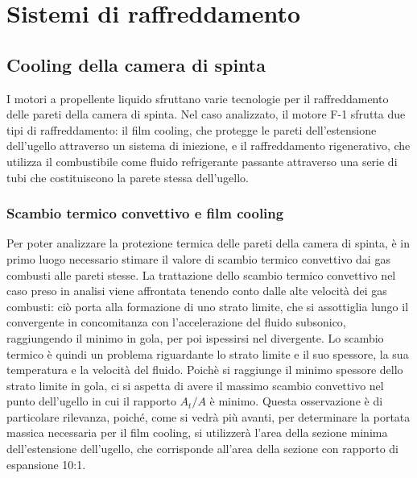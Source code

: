 \section{Sistemi di raffreddamento}
\label{sec:raffreddamento}

\subsection{Cooling della camera di spinta}
\label{subsec:cooling camera}

I motori a propellente liquido sfruttano varie tecnologie per il raffreddamento delle pareti della camera di spinta. Nel caso analizzato, il motore F-1 sfrutta due tipi di raffreddamento: il film cooling, che protegge le pareti dell'estensione dell'ugello attraverso un sistema di iniezione, e il raffreddamento rigenerativo, che utilizza il combustibile come fluido refrigerante passante attraverso una serie di tubi che costituiscono la parete stessa dell'ugello.

\subsubsection{Scambio termico convettivo e film cooling}


Per poter analizzare la protezione termica delle pareti della camera di spinta, è in primo luogo necessario stimare il valore di scambio termico convettivo dai gas combusti alle pareti stesse. La trattazione dello scambio termico convettivo nel caso preso in analisi viene affrontata tenendo conto dalle alte velocità dei gas combusti: ciò porta alla formazione di uno strato limite, che si assottiglia lungo il convergente in concomitanza con l'accelerazione del fluido subsonico, raggiungendo il minimo in gola, per poi ispessirsi nel divergente. Lo scambio termico è quindi un problema riguardante lo strato limite e il suo spessore, la sua temperatura e la velocità del fluido. Poichè si raggiunge il minimo spessore dello strato limite in gola, ci si aspetta di avere il massimo scambio convettivo nel punto dell'ugello in cui il rapporto $A_t/A$ è minimo. Questa osservazione è di particolare rilevanza, poiché, come si vedrà più avanti, per determinare la portata massica necessaria per il film cooling, si utilizzerà l'area della sezione minima dell'estensione dell'ugello, che corrisponde all'area della sezione con rapporto di espansione 10:1.

